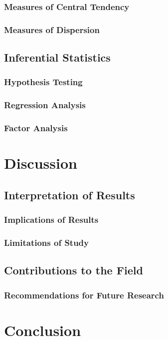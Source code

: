\documentclass[writingLanguage=english, %
    addPageTitle=on,  %
    addDeclaration=on, %
    addMUSTlog=off, %
    addFigTOC=on, %
    addTabTOC=on, %
    refIndent=off, %
    printMod=off, %
]{must}
\begin{document}
\subsection{Measures of Central Tendency}
\subsection{Measures of Dispersion}
\section{Inferential Statistics}
\subsection{Hypothesis Testing}
\subsection{Regression Analysis}
\subsection{Factor Analysis}

\chapter{Discussion}
\section{Interpretation of Results}
\subsection{Implications of Results}
\subsection{Limitations of Study}
\section{Contributions to the Field}
\subsection{Recommendations for Future Research}
\chapter{Conclusion}
\end{document}
